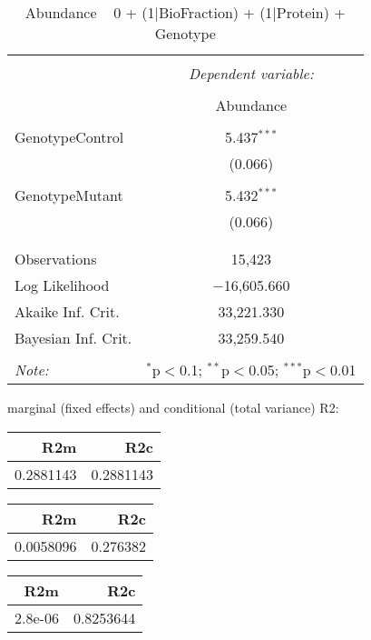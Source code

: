 \documentclass[11pt]{report}
\begin{document}
\begin{table}[!htbp] \centering 
  \caption{Abundance ~ 0 + (1|BioFraction) + (1|Protein) + Genotype} 
  \label{} 
\begin{tabular}{@{\extracolsep{5pt}}lc} 
\\[-1.8ex]\hline 
\hline \\[-1.8ex] 
 & \multicolumn{1}{c}{\textit{Dependent variable:}} \\ 
\cline{2-2} 
\\[-1.8ex] & Abundance \\ 
\hline \\[-1.8ex] 
 GenotypeControl & 5.437$^{***}$ \\ 
  & (0.066) \\ 
  & \\ 
 GenotypeMutant & 5.432$^{***}$ \\ 
  & (0.066) \\ 
  & \\ 
\hline \\[-1.8ex] 
Observations & 15,423 \\ 
Log Likelihood & $-$16,605.660 \\ 
Akaike Inf. Crit. & 33,221.330 \\ 
Bayesian Inf. Crit. & 33,259.540 \\ 
\hline 
\hline \\[-1.8ex] 
\textit{Note:}  & \multicolumn{1}{r}{$^{*}$p$<$0.1; $^{**}$p$<$0.05; $^{***}$p$<$0.01} \\ 
\end{tabular} 
\end{table} 
marginal (fixed effects) and conditional (total variance) R2:

\begin{tabular}{r|r}
\hline
R2m & R2c\\
\hline
0.2881143 & 0.2881143\\
\hline
\end{tabular}

\begin{tabular}{r|r}
\hline
R2m & R2c\\
\hline
0.0058096 & 0.276382\\
\hline
\end{tabular}

\begin{tabular}{r|r}
\hline
R2m & R2c\\
\hline
2.8e-06 & 0.8253644\\
\hline
\end{tabular}
\end{document}
